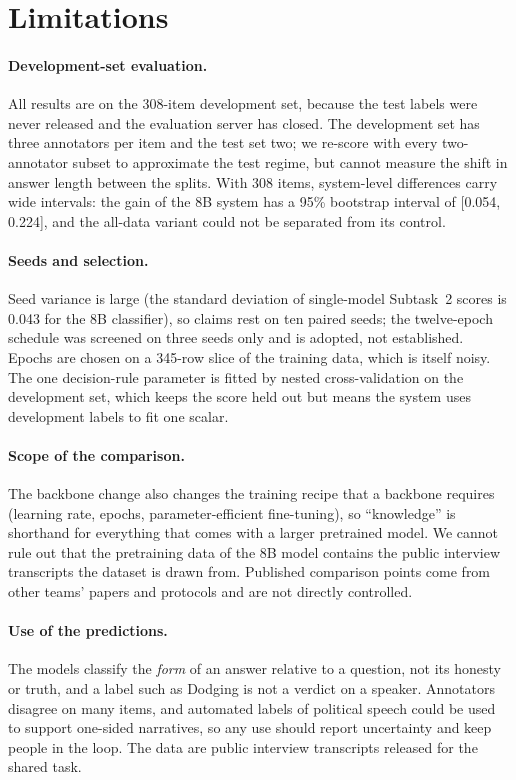 \section*{Limitations}

\paragraph{Development-set evaluation.}
All results are on the 308-item development set, because the test labels were never released and the evaluation server has closed.
The development set has three annotators per item and the test set two; we re-score with every two-annotator subset to approximate the test regime, but cannot measure the shift in answer length between the splits.
With 308 items, system-level differences carry wide intervals: the gain of the 8B system has a 95\% bootstrap interval of [0.054, 0.224], and the all-data variant could not be separated from its control.

\paragraph{Seeds and selection.}
Seed variance is large (the standard deviation of single-model Subtask~2 scores is 0.043 for the 8B classifier), so claims rest on ten paired seeds; the twelve-epoch schedule was screened on three seeds only and is adopted, not established.
Epochs are chosen on a 345-row slice of the training data, which is itself noisy.
The one decision-rule parameter is fitted by nested cross-validation on the development set, which keeps the score held out but means the system uses development labels to fit one scalar.

\paragraph{Scope of the comparison.}
The backbone change also changes the training recipe that a backbone requires (learning rate, epochs, parameter-efficient fine-tuning), so ``knowledge'' is shorthand for everything that comes with a larger pretrained model.
We cannot rule out that the pretraining data of the 8B model contains the public interview transcripts the dataset is drawn from.
Published comparison points come from other teams' papers and protocols and are not directly controlled.

\paragraph{Use of the predictions.}
The models classify the \emph{form} of an answer relative to a question, not its honesty or truth, and a label such as Dodging is not a verdict on a speaker.
Annotators disagree on many items, and automated labels of political speech could be used to support one-sided narratives, so any use should report uncertainty and keep people in the loop.
The data are public interview transcripts released for the shared task.
